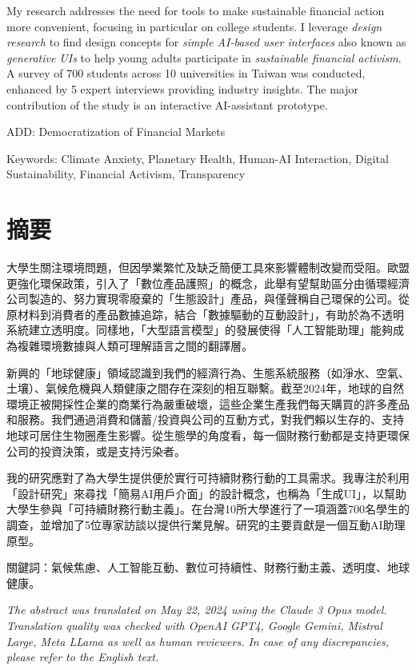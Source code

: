 \documentclass[
  letterpaper,
  DIV=11,
  numbers=noendperiod]{scrartcl}
\begin{document}
My research addresses the need for tools to make sustainable financial
action more convenient, focusing in particular on college students. I
leverage \emph{design research} to find design concepts for \emph{simple
AI-based user interfaces} also known as \emph{generative UIs} to help
young adults participate in \emph{sustainable financial activism}. A
survey of 700 students across 10 universities in Taiwan was conducted,
enhanced by 5 expert interviews providing industry insights. The major
contribution of the study is an interactive AI-assistant prototype.

ADD: Democratization of Financial Markets

Keywords: Climate Anxiety, Planetary Health, Human-AI Interaction,
Digital Sustainability, Financial Activism, Transparency

\newpage

\section{摘要}\label{ux6458ux8981}

大學生關注環境問題，但因學業繁忙及缺乏簡便工具來影響體制改變而受阻。歐盟更強化環保政策，引入了「數位產品護照」的概念，此舉有望幫助區分由循環經濟公司製造的、努力實現零廢棄的「生態設計」產品，與僅聲稱自己環保的公司。從原材料到消費者的產品數據追踪，結合「數據驅動的互動設計」，有助於為不透明系統建立透明度。同樣地，「大型語言模型」的發展使得「人工智能助理」能夠成為複雜環境數據與人類可理解語言之間的翻譯層。

新興的「地球健康」領域認識到我們的經濟行為、生態系統服務（如淨水、空氣、土壤）、氣候危機與人類健康之間存在深刻的相互聯繫。截至2024年，地球的自然環境正被開採性企業的商業行為嚴重破壞，這些企業生產我們每天購買的許多產品和服務。我們通過消費和儲蓄/投資與公司的互動方式，對我們賴以生存的、支持地球可居住生物圈產生影響。從生態學的角度看，每一個財務行動都是支持更環保公司的投資決策，或是支持污染者。

我的研究應對了為大學生提供便於實行可持續財務行動的工具需求。我專注於利用「設計研究」來尋找「簡易AI用戶介面」的設計概念，也稱為「生成UI」，以幫助大學生參與「可持續財務行動主義」。在台灣10所大學進行了一項涵蓋700名學生的調查，並增加了5位專家訪談以提供行業見解。研究的主要貢獻是一個互動AI助理原型。

關鍵詞：氣候焦慮、人工智能互動、數位可持續性、財務行動主義、透明度、地球健康。

\emph{The abstract was translated on May 22, 2024 using the Claude 3
Opus model. Translation quality was checked with OpenAI GPT4, Google
Gemini, Mistral Large, Meta LLama as well as human reviewers. In case of
any discrepancies, please refer to the English text.}
\end{document}
